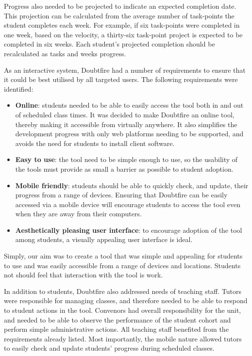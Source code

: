 Progress also needed to be projected to indicate an expected completion date. This projection can be calculated from the average number of task-points the student completes each week.  For example, if six task-points were completed in one week, based on the velocity, a thirty-six task-point project is expected to be completed in six weeks. Each student's projected completion should be recalculated as tasks and weeks progress. 

As an interactive system, Doubtfire had a number of requirements to ensure that it could be best utilised by all targeted users. The following requirements were identified:
\begin{itemize}[noitemsep,nolistsep]
  \item \textbf{Online}: students needed to be able to easily access the tool both in and out of scheduled class times. It was decided to make Doubtfire an online tool, thereby making it accessible from virtually anywhere. It also simplifies the development progress with only web platforms needing to be supported, and avoids the need for students to install client software.
  \item \textbf{Easy to use}: the tool need to be simple enough to use, so the usability of the tools must provide as small a barrier as possible to student adoption.
  \item \textbf{Mobile friendly}: students should be able to quickly check, and update, their progress from a range of devices. Ensuring that Doubtfire can be easily accessed via a mobile device will encourage students to access the tool even when they are away from their computers. 
  \item \textbf{Aesthetically pleasing user interface}: to encourage adoption of the tool among students, a visually appealing user interface is ideal.
\end{itemize}
Simply, our aim was to create a tool that was simple and appealing for students to use and was easily accessible from a range of devices and locations. Students not should feel that interaction with the tool is work.

In addition to students, Doubtfire also addressed needs of teaching staff. Tutors were responsible for managing classes, and therefore needed to be able to respond to student actions in the tool. Convenors had overall responsibility for the unit, and needed to be able to observe the performance of the student cohort and perform simple administrative actions. All teaching staff benefited from the requirements already listed. Most importantly, the mobile nature allowed tutors to easily check and update students' progress during scheduled classes.


